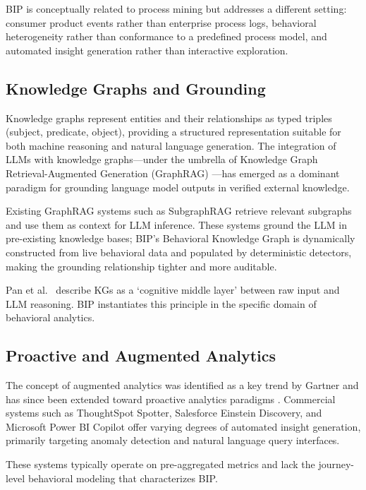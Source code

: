 \documentclass[12pt, a4paper]{article}
\begin{document}
BIP is conceptually related to process mining but addresses a different setting: consumer product events rather than enterprise process logs, behavioral heterogeneity rather than conformance to a predefined process model, and automated insight generation rather than interactive exploration.

\subsection{Knowledge Graphs and Grounding}

Knowledge graphs represent entities and their relationships as typed triples (subject, predicate, object), providing a structured representation suitable for both machine reasoning and natural language generation. The integration of LLMs with knowledge graphs---under the umbrella of Knowledge Graph Retrieval-Augmented Generation (GraphRAG) \cite{li2024,zhang2025}---has emerged as a dominant paradigm for grounding language model outputs in verified external knowledge.

Existing GraphRAG systems such as SubgraphRAG \cite{li2024} retrieve relevant subgraphs and use them as context for LLM inference. These systems ground the LLM in pre-existing knowledge bases; BIP's Behavioral Knowledge Graph is dynamically constructed from live behavioral data and populated by deterministic detectors, making the grounding relationship tighter and more auditable.

Pan et al.\ \cite{pan2024} describe KGs as a `cognitive middle layer' between raw input and LLM reasoning. BIP instantiates this principle in the specific domain of behavioral analytics.

\subsection{Proactive and Augmented Analytics}

The concept of augmented analytics was identified as a key trend by Gartner \cite{gartner2019} and has since been extended toward proactive analytics paradigms \cite{gartner2025}. Commercial systems such as ThoughtSpot Spotter, Salesforce Einstein Discovery, and Microsoft Power BI Copilot offer varying degrees of automated insight generation, primarily targeting anomaly detection and natural language query interfaces.

These systems typically operate on pre-aggregated metrics and lack the journey-level behavioral modeling that characterizes BIP.
\end{document}

